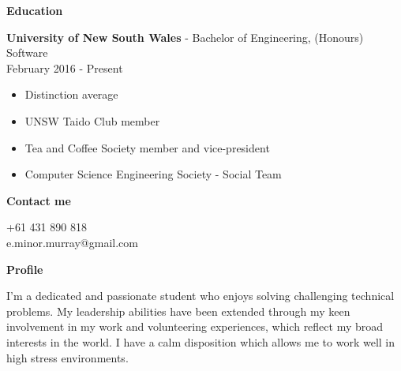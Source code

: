 \documentclass{article}
\newcommand{\minititle}[1]{\begin{center}\textbf{#1} \end{center} \vspace{0.2cm}}
\newcommand{\mytitle}[1]{{\Large\textbf{#1}} \vspace{0.2cm}}
\newcommand{\resumeEntry}[3]{{\large \textbf{#1} - #2} \\ \small{#3}}
\begin{document}
\begin{minipage}[t]{0.6\linewidth}
{    }
    {
        \vspace{0.2cm}
        \minititle{Education}
        \resumeEntry{University of New South Wales}{Bachelor of Engineering, (Honours) Software}{February 2016 - Present}
        \begin{itemize}
            \setlength\itemsep{0.05cm}
            \item Distinction average
            \item UNSW Taido Club member
            \item Tea and Coffee Society member and vice-president
            \item Computer Science Engineering Society - Social Team
        \end{itemize}
    }
\end{minipage}\hspace{1cm}
\begin{minipage}[t]{0.25\linewidth}
    
    \vspace{0.2cm}
    {
        \mytitle{Contact me}

        +61 431 890 818 \\
        e.minor.murray@gmail.com \\
    }

    \vspace{1cm}

    {
        \mytitle{Profile}

        I'm a dedicated and passionate student who enjoys solving challenging technical problems.
        My leadership abilities have been extended through my keen involvement in my work and volunteering experiences, which reflect my broad interests in the world.
        I have a calm disposition which allows me to work well in high stress environments.
    }
\end{minipage}
\end{document}
